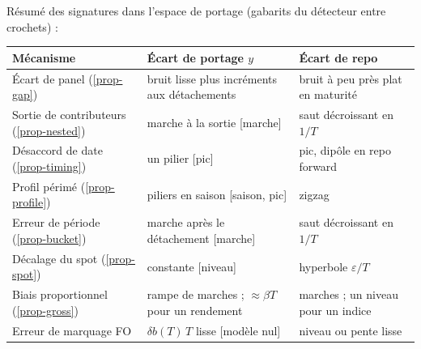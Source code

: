 \begin{insight}
Résumé des signatures dans l'espace de portage (gabarits du détecteur entre crochets) :
\begin{center}\small
\begin{tabular}{p{4.3cm}p{4.9cm}p{4.4cm}}
\toprule
Mécanisme & Écart de portage $y$ & Écart de repo\\
\midrule
Écart de panel (\ref{prop-gap}) & bruit lisse plus incréments aux détachements & bruit à peu près plat en maturité\\
Sortie de contributeurs (\ref{prop-nested}) & marche à la sortie [marche] & saut décroissant en $1/T$\\
Désaccord de date (\ref{prop-timing}) & un pilier [pic] & pic, dipôle en repo forward\\
Profil périmé (\ref{prop-profile}) & piliers en saison [saison, pic] & zigzag\\
Erreur de période (\ref{prop-bucket}) & marche après le détachement [marche] & saut décroissant en $1/T$\\
Décalage du spot (\ref{prop-spot}) & constante [niveau] & hyperbole $\varepsilon/T$\\
Biais proportionnel (\ref{prop-gross}) & rampe de marches ; $\approx\beta T$ pour un rendement & marches ; un niveau pour un indice\\
Erreur de marquage FO & $\delta b(T)\,T$ lisse [modèle nul] & niveau ou pente lisse\\
\bottomrule
\end{tabular}
\end{center}
\end{insight}
